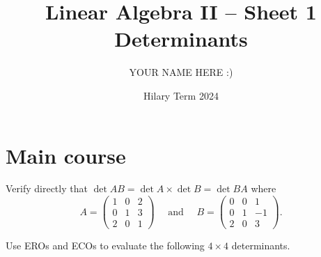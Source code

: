 \documentclass[answers]{exam}
\title{Linear Algebra II -- Sheet 1\\Determinants}
\author{YOUR NAME HERE :)}
\date{Hilary Term 2024}
\begin{document}
\maketitle
\section*{Main course}
\begin{questions}

\question%
Verify directly that $\det A B=\det A \times \det B=\det B A$ where \[
	A=\begin{pmatrix}
		1 & 0 & 2 \\
		0 & 1 & 3 \\
		2 & 0 & 1
	\end{pmatrix} \quad \text { and } \quad B=\begin{pmatrix}
		0 & 0 & 1 \\
		0 & 1 & -1 \\
		2 & 0 & 3
	\end{pmatrix}.
\]



\question%
Use EROs and ECOs to evaluate the following $4 \times 4$ determinants.
\begin{parts}
\part%
\vspace{2em}\phantom{}\vspace{-3.5em}\[
	\begin{vmatrix}
		1 & 2 & 3 & 1 \\
		-2 & 0 & 0 & 2 \\
		6 & 1 & 3 & 4 \\
		0 & 1 & 3 & -1
	\end{vmatrix},
\]

\part%
\vspace{2em}\phantom{}\vspace{-3.5em}\[
	\begin{vmatrix}
		1 & 2 & 4 & 2 \\
		2 & -3 & 1 & -3 \\
		7 & -1 & 0 & 1 \\
		1 & -2 & 1 & 0
	\end{vmatrix}.
\]
\end{parts}




\end{questions}
\end{document}
